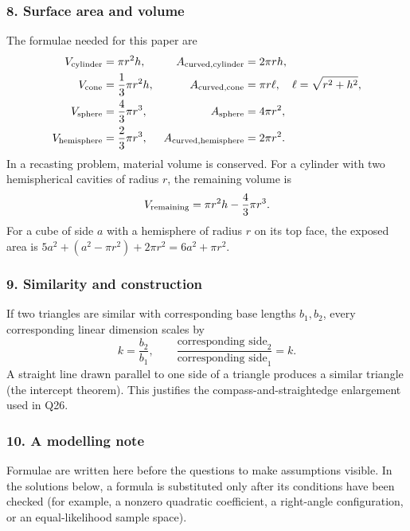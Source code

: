 \subsubsection*{8. Surface area and volume}
The formulae needed for this paper are
\begin{align}
V_{\rm cylinder}&=\pi r^2h,& A_{\rm curved,cylinder}&=2\pi rh,\label{eq:cylinder-formula}\\
V_{\rm cone}&=\frac13\pi r^2h,& A_{\rm curved,cone}&=\pi r\ell,\quad \ell=\sqrt{r^2+h^2},\label{eq:cone-formula}\\
V_{\rm sphere}&=\frac43\pi r^3,& A_{\rm sphere}&=4\pi r^2,\label{eq:sphere-formula}\\
V_{\rm hemisphere}&=\frac23\pi r^3,& A_{\rm curved,hemisphere}&=2\pi r^2.\label{eq:hemisphere-formula}
\end{align}
In a recasting problem, material volume is conserved. For a cylinder with two hemispherical cavities of radius $r$, the remaining volume is
\begin{equation}
V_{\rm remaining}=\pi r^2h-\frac43\pi r^3.
\label{eq:scooped-cylinder}
\end{equation}
For a cube of side $a$ with a hemisphere of radius $r$ on its top face, the exposed area is $5a^2+(a^2-\pi r^2)+2\pi r^2=6a^2+\pi r^2$.

\subsubsection*{9. Similarity and construction}
If two triangles are similar with corresponding base lengths $b_1,b_2$, every corresponding linear dimension scales by
\begin{equation}
k=\frac{b_2}{b_1},\qquad
\frac{\text{corresponding side}_2}{\text{corresponding side}_1}=k.
\label{eq:similarity}
\end{equation}
A straight line drawn parallel to one side of a triangle produces a similar triangle (the intercept theorem). This justifies the compass-and-straightedge enlargement used in Q26.

\subsubsection*{10. A modelling note}
Formulae are written here before the questions to make assumptions visible. In the solutions below, a formula is substituted only after its conditions have been checked (for example, a nonzero quadratic coefficient, a right-angle configuration, or an equal-likelihood sample space).
